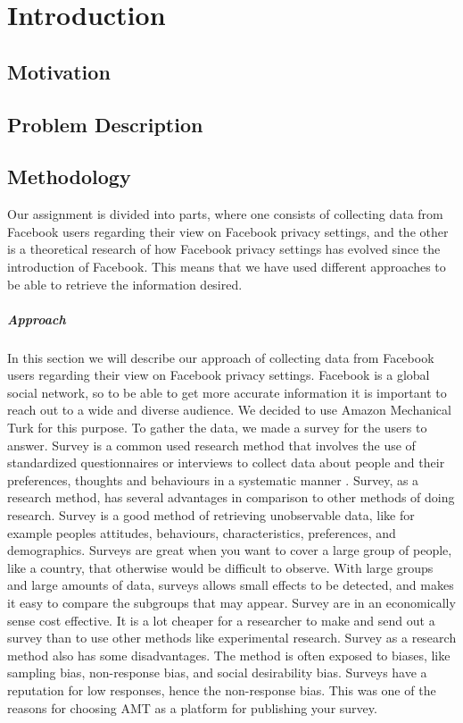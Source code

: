 \chapter{Introduction}
\label{chp:introduction} 

\section{Motivation}

\section{Problem Description}

\section{Methodology}
\label{sec:methodology}
Our assignment is divided into parts, where one consists of collecting data from Facebook users regarding their view on Facebook privacy settings, and the other is a theoretical research of how Facebook privacy settings has evolved since the introduction of Facebook. This means that we have used different approaches to be able to retrieve the information desired.

\paragraph{Approach}
In this section we will describe our approach of collecting data from Facebook users regarding their view on Facebook privacy settings. Facebook is a global social network, so to be able to get more accurate information it is important to reach out to a wide and diverse audience. We decided to use Amazon Mechanical Turk for this purpose. To gather the data, we made a survey for the users to answer. Survey is a common used research method that involves the use of standardized questionnaires or interviews to collect data about people and their preferences, thoughts and behaviours in a systematic manner \cite{survey}. Survey, as a research method, has several advantages in comparison to other methods of doing research. Survey is a good method of retrieving unobservable data, like for example peoples attitudes, behaviours, characteristics, preferences, and demographics. Surveys are great when you want to cover a large group of people, like a country, that otherwise would be difficult to observe. With large groups and large amounts of data, surveys allows small effects to be detected, and makes it easy to compare the subgroups that may appear. Survey are in an economically sense cost effective. It is a lot cheaper for a researcher to make and send out a survey than to use other methods like experimental research. Survey as a research method also has some disadvantages. The method is often exposed to biases, like sampling bias, non-response bias, and social desirability bias. Surveys have a reputation for low responses, hence the non-response bias. This was one of the reasons for choosing AMT as a platform for publishing your survey. 

